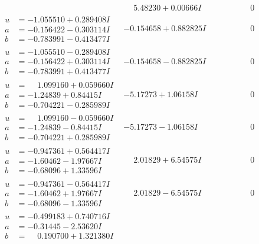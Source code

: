 \documentclass[1p]{elsarticle_modified}
\theoremstyle{definition}
\begin{document}
$$\begin{array}{c|c|c}
 & \phantom{-}5.48230 + 0.00666 I & \phantom{-0.000000 } 0 \\ \hline\begin{aligned}
u &= -1.055510 + 0.289408 I \\
a &= -0.156422 - 0.303114 I \\
b &= -0.783991 - 0.413477 I\end{aligned}
 & -0.154658 + 0.882825 I & \phantom{-0.000000 } 0 \\ \hline\begin{aligned}
u &= -1.055510 - 0.289408 I \\
a &= -0.156422 + 0.303114 I \\
b &= -0.783991 + 0.413477 I\end{aligned}
 & -0.154658 - 0.882825 I & \phantom{-0.000000 } 0 \\ \hline\begin{aligned}
u &= \phantom{-}1.099160 + 0.059660 I \\
a &= -1.24839 + 0.84415 I \\
b &= -0.704221 - 0.285989 I\end{aligned}
 & -5.17273 + 1.06158 I & \phantom{-0.000000 } 0 \\ \hline\begin{aligned}
u &= \phantom{-}1.099160 - 0.059660 I \\
a &= -1.24839 - 0.84415 I \\
b &= -0.704221 + 0.285989 I\end{aligned}
 & -5.17273 - 1.06158 I & \phantom{-0.000000 } 0 \\ \hline\begin{aligned}
u &= -0.947361 + 0.564417 I \\
a &= -1.60462 - 1.97667 I \\
b &= -0.68096 + 1.33596 I\end{aligned}
 & \phantom{-}2.01829 + 6.54575 I & \phantom{-0.000000 } 0 \\ \hline\begin{aligned}
u &= -0.947361 - 0.564417 I \\
a &= -1.60462 + 1.97667 I \\
b &= -0.68096 - 1.33596 I\end{aligned}
 & \phantom{-}2.01829 - 6.54575 I & \phantom{-0.000000 } 0 \\ \hline\begin{aligned}
u &= -0.499183 + 0.740716 I \\
a &= -0.31445 - 2.53620 I \\
b &= \phantom{-}0.190700 + 1.321380 I\end{aligned}

\end{array}$$
\end{document}

